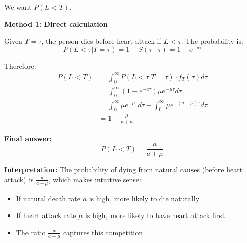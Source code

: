 \documentclass[11pt]{article}
\begin{document}
We want $P(L < T)$.

\textbf{Method 1: Direct calculation}

Given $T = \tau$, the person dies before heart attack if $L < \tau$. The probability is:
$$P(L < \tau | T = \tau) = 1 - S(\tau^-|\tau) = 1 - e^{-a\tau}$$

Therefore:
\begin{align*}
P(L < T) &= \int_0^\infty P(L < \tau | T = \tau) \cdot f_T(\tau) d\tau \\
&= \int_0^\infty (1 - e^{-a\tau}) \mu e^{-\mu\tau} d\tau \\
&= \int_0^\infty \mu e^{-\mu\tau} d\tau - \int_0^\infty \mu e^{-(a+\mu)\tau} d\tau \\
&= 1 - \frac{\mu}{a+\mu}
\end{align*}

\textbf{Final answer:}
$$\boxed{P(L < T) = \frac{a}{a+\mu}}$$

\textbf{Interpretation:} The probability of dying from natural causes (before heart attack) is $\frac{a}{a+\mu}$, which makes intuitive sense:
\begin{itemize}
    \item If natural death rate $a$ is high, more likely to die naturally
    \item If heart attack rate $\mu$ is high, more likely to have heart attack first
    \item The ratio $\frac{a}{a+\mu}$ captures this competition
\end{itemize}
\end{document}
